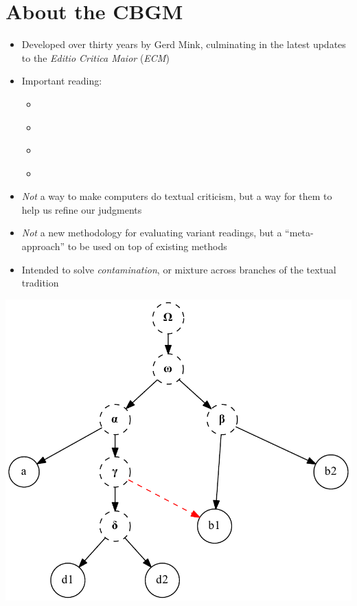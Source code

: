 \documentclass[10pt]{beamer}
\begin{document}
	\section*{About the CBGM}
	\begin{frame}
		\begin{itemize}
			\item Developed over thirty years by Gerd Mink, culminating in the latest updates to the \emph{Editio Critica Maior} (\emph{ECM})
			\item Important reading:
			\begin{itemize} 
				\item \cite{Mink04}
				\item \cite{Gurry17}
				\item \cite{WG17}
				\item \cite{Edmondson19}
			\end{itemize}
		\end{itemize}
	\end{frame}
	\begin{frame}
		\begin{itemize}
			\item \emph{Not} a way to make computers do textual criticism, but a way for them to help us refine our judgments
			\item \emph{Not} a new methodology for evaluating variant readings, but a ``meta-approach'' to be used on top of existing methods
		\end{itemize}
	\end{frame}
	\begin{frame}
		\begin{itemize}
			\item Intended to solve \emph{contamination}, or mixture across branches of the textual tradition
		\end{itemize}
		\begin{center}
			\includegraphics[scale=0.5]{../img/stemma-contamination.pdf}
		\end{center}
	\end{frame}
\end{document}
